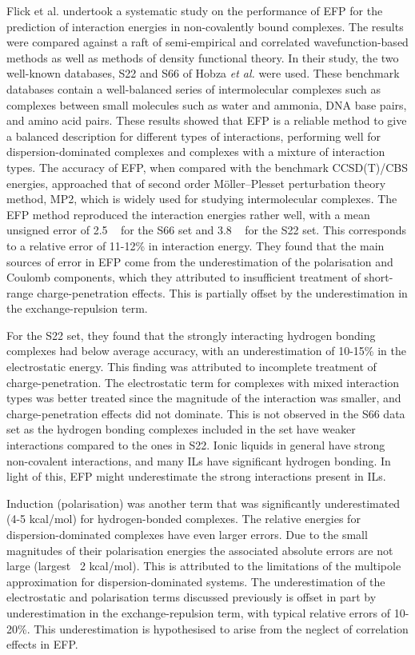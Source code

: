 Flick et al. undertook a systematic study on the performance of EFP for the prediction of interaction energies in non-covalently bound complexes.
\cite{Flick2012a}
The results were compared against a raft of semi-empirical and correlated wavefunction-based methods as well as methods of density functional theory.
In their study, the two well-known databases, S22 and S66 of Hobza \emph{et al.}
\cite{Jurecka2006a, Rezac2011a}    
were used.
These benchmark databases contain a well-balanced series of intermolecular complexes such as complexes between small molecules such as water and ammonia, DNA base pairs, and amino acid pairs. 
These results showed that EFP is a reliable method to give a balanced description for different types of interactions, performing well for dispersion-dominated complexes and complexes with a mixture of interaction types.
The accuracy of EFP, when compared with the benchmark CCSD(T)/CBS energies, approached that of second order M\"{o}ller--Plesset perturbation theory method, MP2, which is widely used for studying intermolecular complexes. 
The EFP method reproduced the interaction energies rather well, with a mean unsigned error of 2.5 \enUnit~ for the S66 set and 3.8 \enUnit~ for the S22 set.
This corresponds to a relative error of 11-12\% in interaction energy. 
They found that the main sources of error in EFP come from the underestimation of the polarisation and Coulomb components, which they attributed to insufficient treatment of short-range charge-penetration effects. 
This is partially offset by the underestimation in the exchange-repulsion term.

For the S22 set, they found that the strongly interacting hydrogen bonding complexes had below average accuracy, with an underestimation of 10-15\% in the electrostatic energy. This finding was attributed to incomplete treatment of charge-penetration.
The electrostatic term for complexes with mixed interaction types was better treated since the magnitude of the interaction was smaller, and charge-penetration effects did not dominate.
This is not observed in the S66 data set as the hydrogen bonding complexes included in the set have weaker interactions compared to the ones in S22.
Ionic liquids in general have strong non-covalent interactions, and many ILs have significant hydrogen bonding.
In light of this, EFP might underestimate the strong interactions present in ILs.


Induction (polarisation) was another term that was significantly underestimated (4-5 kcal/mol) for hydrogen-bonded complexes.
\cite{Flick2012a}
The relative energies for dispersion-dominated complexes have even larger errors. Due to the small magnitudes of their polarisation energies the associated absolute errors are not large (largest ~2 kcal/mol).
This is attributed to the limitations of the multipole approximation for dispersion-dominated systems. The underestimation of the electrostatic and polarisation terms discussed previously is offset in part by underestimation in the exchange-repulsion term, with typical relative errors of 10-20\%. This underestimation is hypothesised to arise from the neglect of correlation effects in EFP.

